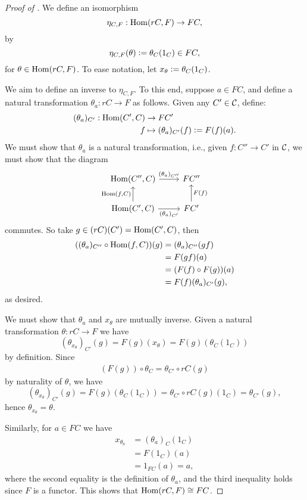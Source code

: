 \begin{proof}[Proof of ]
We define an isomorphism
\[\eta_{C,F}:\operatorname{Hom}(rC,F)\to FC,\] by
\[
\eta_{C,F}(\theta)\vcentcolon=\theta_C(1_C)\in FC,
\]for $\theta\in\operatorname{Hom}(rC,F)$. To ease notation, let $x_\theta\vcentcolon=\theta_C(1_C)$.

We aim to define an inverse to $\eta_{C,F}$. To this end, suppose $a\in FC$, and define a natural transformation $\theta_a:rC\to F$ as follows. Given any $C'\in\mathcal{C}$, define:
\begin{align*}
(\theta_a)_{C'}:\operatorname{Hom}(C',C)&\to FC'\\
f&\mapsto (\theta_a)_{C'}(f)\vcentcolon= F(f)(a).
\end{align*}
We must show that $\theta_a$ is a natural transformation, i.e., given $f:C''\to C'$ in $\mathcal{C}$, we must show that the diagram
\[\begin{tikzcd}\Hom(C'',C)\arrow{r}{(\theta_a)_{C''}} & FC''\\
\Hom(C',C)\arrow{u}{\Hom(f,C)}\arrow{r}[swap]{(\theta_a)_{C'}} & FC'\arrow{u}[swap]{F(f)}
\end{tikzcd}\]
commutes. So take $g\in (rC)(C')=\operatorname{Hom}(C',C)$, then
\begin{align*}
((\theta_a)_{C''}\circ\operatorname{Hom}(f,C))(g)&= (\theta_a)_{C''}(gf)\\
&= F(gf)(a)\\
&= (F(f)\circ F(g))(a)\\
&= F(f)(\theta_a)_{C'}(g),
\end{align*}
as desired.

We must show that $\theta_a$ and $x_\theta$ are mutually inverse. Given a natural transformation $\theta:rC\to F$ we have
\[
(\theta_{x_\theta})_{C'}(g)=F(g)(x_\theta)=F(g)(\theta_C(1_C))
\]by definition. Since 
\begin{align}(F(g))\circ\theta_C=\theta_{C'}\circ rC(g)\label{nat1}
\end{align}by naturality of $\theta$, we have
\[
(\theta_{x_\theta})_{C'}(g)=F(g)(\theta_C(1_C))=\theta_{C'}\circ rC(g)(1_C)=\theta_{C'}(g),
\]
hence $\theta_{x_\theta}=\theta$. 

Similarly, for $a\in FC$ we have
\begin{align*}
x_{\theta_a}&=(\theta_a)_C(1_C)\\
&= F(1_C)(a)\\
&=1_{FC}(a)=a,
\end{align*}
where the second equality is the definition of $\theta_a$, and the third inequality holds since $F$ is a functor. This shows that $\operatorname{Hom}(rC,F)\cong FC$.


\end{proof}
